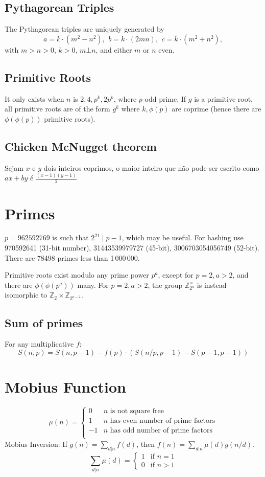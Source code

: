 \subsection{Pythagorean Triples}
 The Pythagorean triples are uniquely generated by
 \[ a=k\cdot (m^{2}-n^{2}),\ \,b=k\cdot (2mn),\ \,c=k\cdot (m^{2}+n^{2}), \]
 with $m > n > 0$, $k > 0$, $m \bot n$, and either $m$ or $n$ even.

\subsection{Primitive Roots}
	It only exists when $n$ is $2, 4, p^k, 2p^k$, where $p$ odd prime.
	If $g$ is a primitive root, all primitive roots are of the form $g^k$
	where $k,\phi(p)$ are coprime (hence there are $\phi(\phi(p))$ primitive roots).
	
\subsection{Chicken McNugget theorem}
	Sejam $x$ e $y$ dois inteiros coprimos, o maior inteiro que não pode ser escrito como $ax + by$ é $\frac{(x-1)(y-1)}{2}$

\section{Primes}
	$p=962592769$ is such that $2^{21} \mid p-1$, which may be useful. For hashing
	use 970592641 (31-bit number), 31443539979727 (45-bit), 3006703054056749
	(52-bit). There are 78498 primes less than 1\,000\,000.

	Primitive roots exist modulo any prime power $p^a$, except for $p = 2, a > 2$, and there are $\phi(\phi(p^a))$ many.
	For $p = 2, a > 2$, the group $\mathbb Z_{2^a}^\times$ is instead isomorphic to $\mathbb Z_2 \times \mathbb Z_{2^{a-2}}$.

\subsection{Sum of primes} For any multiplicative $f$:
                \[ S(n,p) = S(n, p-1) - f(p) \cdot (S(n/p,p-1) - S(p-1,p-1))\]

\section{Mobius Function}
\[
	\mu(n) = \begin{cases} 0 & n \textrm{ is not square free}\\ 1 & n \textrm{ has even number of prime factors}\\ -1 & n \textrm{ has odd number of prime factors}\\\end{cases}
\]
  Mobius Inversion: If $g(n) = \sum_{d|n} f(d)$, then $f(n) = \sum_{d|n} \mu(d)g(n/d)$.
  \[
	  \sum_{d | n} \mu(d) = \begin{cases} 1 & \text{if } n = 1 \\ 0  & \text{if } n > 1 \end{cases}
  \]


